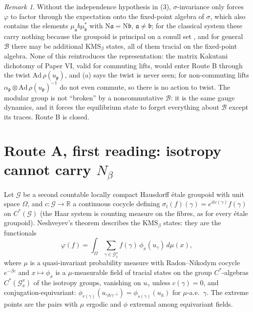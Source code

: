 \documentclass[11pt]{amsart}
\numberwithin{equation}{section}
\theoremstyle{definition}
\theoremstyle{remark}
\newtheorem{remark}[theorem]{Remark}
\newcommand{\R}{\mathbb{R}}
\newcommand{\cB}{\mathcal{B}}
\newcommand{\cG}{\mathcal{G}}
\newcommand{\pp}{\mathfrak{p}}
\newcommand{\aaa}{\mathfrak{a}}
\newcommand{\bb}{\mathfrak{b}}
\newcommand{\Ns}{\mathrm{N}}
\begin{document}
\begin{remark}
Without the independence hypothesis in (3), $\sigma$-invariance only forces $\varphi$ to
factor through the expectation onto the fixed-point algebra of $\sigma$, which also
contains the elements $\mu_\aaa b\mu_\bb^*$ with $\Ns\aaa=\Ns\bb$, $\aaa\ne\bb$; for the
classical system these carry nothing because the groupoid is principal on a conull set
\cite[Prop.~2.8]{Main}, and for general $\cB$ there may be additional $\mathrm{KMS}_\beta$
states, all of them tracial on the fixed-point algebra. None of this reintroduces the
representation: the matrix Kakutani dichotomy of Paper VI, valid for commuting lifts,
would enter Route B through the twist $\mathrm{Ad}\,\rho(u_\pp)$, and (a) says the twist is
never seen; for non-commuting lifts $\alpha_\pp\otimes\mathrm{Ad}\,\rho(u_\pp)^{-1}$ do not
even commute, so there is no action to twist. The modular group is not ``broken'' by a
noncommutative $\cB$: it is the same gauge dynamics, and it forces the equilibrium state
to forget everything about $\cB$ except its traces. Route B is closed.
\end{remark}

\section{Route A, first reading: isotropy cannot carry $N_\beta$}\label{sec:iso}

Let $\cG$ be a second countable locally compact Hausdorff \'etale groupoid with unit space
$\Omega$, and $c:\cG\to\R$ a continuous cocycle defining $\sigma_t(f)(\gamma)=e^{itc(\gamma)}f(\gamma)$
on $C^*(\cG)$ (the Haar system is counting measure on the fibres, as for every \'etale
groupoid). Neshveyev's theorem \cite[Thm.~1.3]{Neshveyev} describes the $\mathrm{KMS}_\beta$
states: they are the functionals
\begin{equation}\label{eq:nesh}
\varphi(f)=\int_\Omega\sum_{\gamma\in\cG_x^x}f(\gamma)\,\phi_x(u_\gamma)\,d\mu(x),
\end{equation}
where $\mu$ is a quasi-invariant probability measure with Radon--Nikodym cocycle $e^{-\beta c}$
and $x\mapsto\phi_x$ is a $\mu$-measurable field of tracial states on the group
$C^*$-algebras $C^*(\cG_x^x)$ of the isotropy groups, vanishing on $u_\gamma$ unless
$c(\gamma)=0$, and conjugation-equivariant: $\phi_{r(\gamma)}(u_{\gamma h\gamma^{-1}})=\phi_{s(\gamma)}(u_h)$
for $\mu$-a.e.\ $\gamma$. The extreme points are the pairs with $\mu$ ergodic and $\phi$
extremal among equivariant fields.
\end{document}
